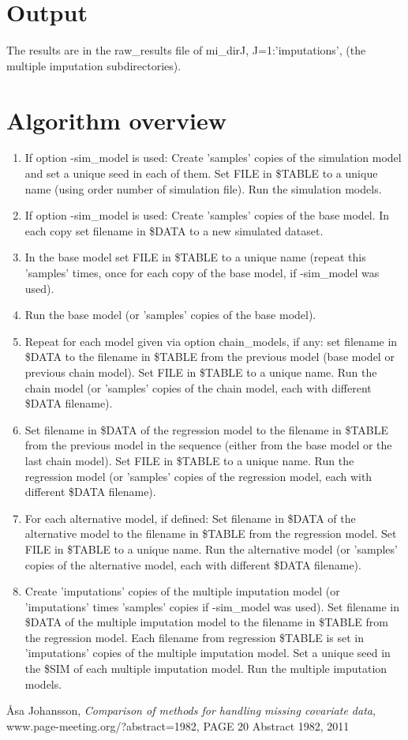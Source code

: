 \documentclass[a4paper,12pt]{article}
\begin{document}
\section{Output}
The results are in the raw\_results file of mi\_dirJ, J=1:'imputations', (the multiple imputation subdirectories).

\section{Algorithm overview}

\begin{enumerate}

\item If option -sim\_model is used: Create 'samples' copies of the simulation model and set a unique  seed in each of them. Set FILE in \$TABLE to a unique name (using order number of simulation file). Run the simulation models.
\item If option -sim\_model is used: Create 'samples' copies of the base model. In each copy set filename in \$DATA to a new simulated dataset.
\item In the base model set FILE in \$TABLE to a unique name (repeat this 'samples' times, once for each copy of the base model, if -sim\_model was used).
\item Run the base model (or 'samples' copies of the base model).
\item Repeat for each model given via option chain\_models, if any: set filename in \$DATA to the filename in \$TABLE from the previous model (base model or previous chain model). Set FILE in \$TABLE to a unique name. Run the chain model (or 'samples' copies of the chain model, each with different \$DATA filename).
\item Set filename in \$DATA of the regression model to the filename in \$TABLE from the previous model in the sequence (either from the base model or the last chain model). Set FILE in \$TABLE to a unique name. Run the regression model (or 'samples' copies of the regression model, each with different \$DATA filename).
\item For each alternative model, if defined: Set filename in \$DATA of the alternative model to the filename in \$TABLE from the regression model. Set FILE in \$TABLE to a unique name. Run the alternative model (or 'samples' copies of the alternative model, each with different \$DATA filename).
\item Create 'imputations' copies of the multiple imputation model (or 'imputations' times 'samples' copies if -sim\_model was used). Set filename in \$DATA of the multiple imputation model to the filename in \$TABLE from the regression model. Each filename from regression \$TABLE is set in 'imputations' copies of the multiple imputation model. Set a unique seed in the \$SIM of each multiple imputation model. Run the multiple imputation models.
\end{enumerate}



\begin{thebibliography}{1}

 Åsa Johansson, {\em Comparison of methods for handling missing covariate data}, www.page-meeting.org/?abstract=1982, PAGE 20 Abstract 1982, 2011
\end{thebibliography}
\end{document}
